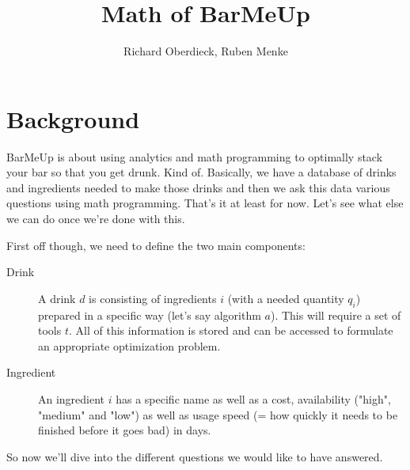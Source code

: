 \documentclass{article}
\author{Richard Oberdieck, Ruben Menke}
\title{Math of BarMeUp}
\begin{document}
\maketitle

\section{Background}
BarMeUp is about using analytics and math programming to optimally stack your bar so that you get drunk. Kind of. Basically, we have a database of drinks and ingredients needed to make those drinks and then we ask this data various questions using math programming. That's it at least for now. Let's see what else we can do once we're done with this.

First off though, we need to define the two main components:
\begin{description}
\item[Drink]{A drink $d$ is consisting of ingredients $i$ (with a needed quantity $q_i$) prepared in a specific way (let's say algorithm $a$). This will require a set of tools $t$. All of this information is stored and can be accessed to formulate an appropriate optimization problem.}
\item[Ingredient]{An ingredient $i$ has a specific name as well as a cost, availability ("high", "medium" and "low") as well as usage speed (= how quickly it needs to be finished before it goes bad) in days.}
\end{description}


So now we'll dive into the different questions we would like to have answered.
\end{document}
